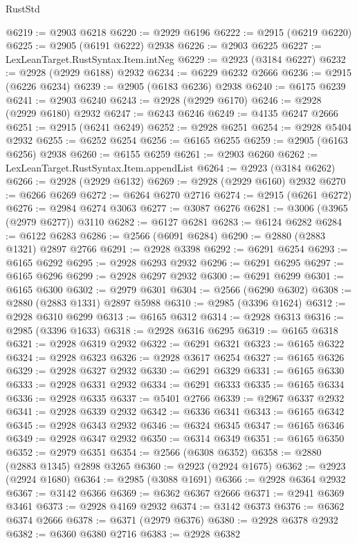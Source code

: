 \begin{lexlean}{RustStd}
\begin{coremodule}
{\begin{coremodule}
{{{{{{{{{{{{{{{{{{{{{{{{{{{{{{{{{{{{{{{{{{{{{{{{{{{{{{{{{{{{{{{{{{{{{{{{{{{{{{@6219 := @2903 @6218
@6220 := @2929 @6196
@6222 := @2915 (@6219 @6220)
@6225 := @2905 (@6191 @6222) @2938
@6226 := @2903 @6225
@6227 := LexLeanTarget.RustSyntax.Item.intNeg
@6229 := @2923 (@3184 @6227)
@6232 := @2928 (@2929 @6188) @2932
@6234 := @6229 @6232 @2666
@6236 := @2915 (@6226 @6234)
@6239 := @2905 (@6183 @6236) @2938
@6240 := @6175 @6239
@6241 := @2903 @6240
@6243 := @2928 (@2929 @6170)
@6246 := @2928 (@2929 @6180) @2932
@6247 := @6243 @6246
@6249 := @4135 @6247 @2666
@6251 := @2915 (@6241 @6249)
@6252 := @2928 @6251
@6254 := @2928 @5404 @2932
@6255 := @6252 @6254
@6256 := @6165 @6255
@6259 := @2905 (@6163 @6256) @2938
@6260 := @6155 @6259
@6261 := @2903 @6260
@6262 := LexLeanTarget.RustSyntax.Item.appendList
@6264 := @2923 (@3184 @6262)
@6266 := @2928 (@2929 @6132)
@6269 := @2928 (@2929 @6160) @2932
@6270 := @6266 @6269
@6272 := @6264 @6270 @2716
@6274 := @2915 (@6261 @6272)
@6276 := @2984 @6274 @3063
@6277 := @3087 @6276
@6281 := @3006 (@3965 (@2979 @6277)) @3110
@6282 := @6127 @6281
@6283 := @6124 @6282
@6284 := @6122 @6283
@6286 := @2566 (@6091 @6284)
@6290 := @2880 (@2883 @1321) @2897 @2766
@6291 := @2928 @3398
@6292 := @6291 @6254
@6293 := @6165 @6292
@6295 := @2928 @6293 @2932
@6296 := @6291 @6295
@6297 := @6165 @6296
@6299 := @2928 @6297 @2932
@6300 := @6291 @6299
@6301 := @6165 @6300
@6302 := @2979 @6301
@6304 := @2566 (@6290 @6302)
@6308 := @2880 (@2883 @1331) @2897 @5988
@6310 := @2985 (@3396 @1624)
@6312 := @2928 @6310 @6299
@6313 := @6165 @6312
@6314 := @2928 @6313
@6316 := @2985 (@3396 @1633)
@6318 := @2928 @6316 @6295
@6319 := @6165 @6318
@6321 := @2928 @6319 @2932
@6322 := @6291 @6321
@6323 := @6165 @6322
@6324 := @2928 @6323
@6326 := @2928 @3617 @6254
@6327 := @6165 @6326
@6329 := @2928 @6327 @2932
@6330 := @6291 @6329
@6331 := @6165 @6330
@6333 := @2928 @6331 @2932
@6334 := @6291 @6333
@6335 := @6165 @6334
@6336 := @2928 @6335
@6337 := @5401 @2766
@6339 := @2967 @6337 @2932
@6341 := @2928 @6339 @2932
@6342 := @6336 @6341
@6343 := @6165 @6342
@6345 := @2928 @6343 @2932
@6346 := @6324 @6345
@6347 := @6165 @6346
@6349 := @2928 @6347 @2932
@6350 := @6314 @6349
@6351 := @6165 @6350
@6352 := @2979 @6351
@6354 := @2566 (@6308 @6352)
@6358 := @2880 (@2883 @1345) @2898 @3265
@6360 := @2923 (@2924 @1675)
@6362 := @2923 (@2924 @1680)
@6364 := @2985 (@3088 @1691)
@6366 := @2928 @6364 @2932
@6367 := @3142 @6366
@6369 := @6362 @6367 @2666
@6371 := @2941 @6369 @3461
@6373 := @2928 @4169 @2932
@6374 := @3142 @6373
@6376 := @6362 @6374 @2666
@6378 := @6371 (@2979 @6376)
@6380 := @2928 @6378 @2932
@6382 := @6360 @6380 @2716
@6383 := @2928 @6382
}}}}}}}}}}}}}}}}}}}}}}}}}}}}}}}}}}}}}}}}}}}}}}}}}}}}}}}}}}}}}}}}}}}}}}}}}}}}}}
\end{coremodule}}
\end{coremodule}
\end{lexlean}
